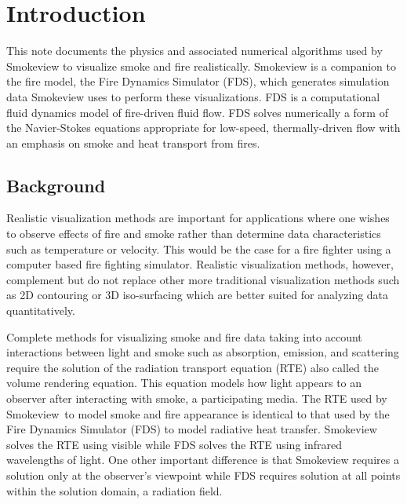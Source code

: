 %
%

\section{Introduction}
This note documents the physics and associated numerical algorithms used by Smokeview\cite{Smokeview_Users_Guide} to visualize smoke and fire realistically.  Smokeview is a companion to the fire model, the Fire Dynamics Simulator (FDS), which generates   simulation data Smokeview uses to perform these visualizations. FDS is a computational fluid dynamics model of fire-driven fluid flow. FDS solves numerically a form of the Navier-Stokes equations appropriate for low-speed, thermally-driven flow with an emphasis on smoke and heat transport from fires\cite{FDS_Tech_Guide}.

\subsection{Background}

Realistic visualization methods are important for applications where one wishes to observe effects of fire and smoke rather than determine data characteristics such as temperature or velocity.  This would be the case for a fire fighter using a computer based fire fighting simulator. Realistic visualization methods, however, complement but do not replace other more traditional visualization methods such as 2D contouring or 3D iso-surfacing which are better suited for analyzing data quantitatively.

Complete methods for visualizing smoke and fire data taking into account interactions between light and smoke such as absorption, emission, and scattering require the solution of the radiation transport equation (RTE)\cite{Siegel:2001} also called the volume rendering equation\cite{levoy:1988}. This equation models how light appears to an observer after interacting with smoke, a participating media. The RTE used by Smokeview\citesmv\ to model smoke and fire appearance is identical to that used by the Fire Dynamics Simulator (FDS)\cite{FDS_Tech_Guide} to model radiative heat transfer.  Smokeview solves the RTE using visible while FDS solves the RTE using infrared wavelengths of light. One other important difference is that Smokeview requires a solution only at the observer's viewpoint while FDS requires solution at all points within the solution domain, a radiation field.

